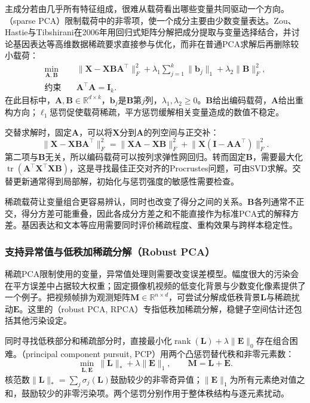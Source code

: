 主成分若由几乎所有特征组成，很难从载荷看出哪些变量共同驱动一个方向。（sparse PCA）限制载荷中的非零项，使一个成分主要由少数变量表达。Zou、Hastie与Tibshirani在2006年用回归式矩阵分解把成分提取与变量选择结合，并讨论基因表达等高维数据稀疏要求直接参与优化，而非在普通PCA求解后再删除较小载荷：
\begin{equation}
  \begin{aligned}
  \min_{\bm{A},\bm{B}}\quad&
    \lVert\bm{X}-\bm{X}\bm{B}\bm{A}^{\top}\rVert_F^2
    +\lambda_1\sum_{j=1}^{k}\lVert\bm{b}_j\rVert_1
    +\lambda_2\lVert\bm{B}\rVert_F^2,\\
  \text{约束}\quad&\bm{A}^{\top}\bm{A}=\bm{I}_k.
  \end{aligned}
  \label{eq:dim-sparse-pca}
\end{equation}
在此目标中，$\bm{A},\bm{B}\in\mathbb{R}^{d\times k}$，$\bm{b}_j$是$\bm{B}$第$j$列，$\lambda_1,\lambda_2\geq0$。$\bm{B}$给出编码载荷，$\bm{A}$给出重构方向；$\ell_1$惩罚促使载荷稀疏，平方惩罚缓解相关变量造成的数值不稳定。

交替求解时，固定$\bm{A}$，可以将$\bm{X}$分到$\bm{A}$的列空间与正交补：
\[
  \lVert\bm{X}-\bm{X}\bm{B}\bm{A}^{\top}\rVert_F^2
  =\lVert\bm{X}\bm{A}-\bm{X}\bm{B}\rVert_F^2
   +\lVert\bm{X}(\bm{I}-\bm{A}\bm{A}^{\top})\rVert_F^2.
\]
第二项与$\bm{B}$无关，所以编码载荷可以按列求弹性网回归。转而固定$\bm{B}$，需要最大化$\operatorname{tr}(\bm{A}^{\top}\bm{X}^{\top}\bm{X}\bm{B})$，这是寻找最佳正交对齐的Procrustes问题，可由SVD求解。交替更新通常得到局部解，初始化与惩罚强度的敏感性需要检查。

稀疏载荷让变量组合更容易辨认，同时也改变了得分之间的关系。$\bm{B}$各列通常不正交，得分方差可能重叠，因此各成分方差之和不能直接作为标准PCA式的解释方差。基因表达和文本等应用需要同时评价稀疏程度、重构效果与跨样本稳定性。

\subsubsection{支持异常值与低秩加稀疏分解（Robust PCA）}
\label{sec:dim-robust-pca}

稀疏PCA限制使用的变量，异常值处理则需要改变误差模型。幅度很大的污染会在平方误差中占据较大权重；固定摄像机视频的低变化背景与少数变化像素提供了一个例子。把视频帧排为观测矩阵$\bm{M}\in\mathbb{R}^{n\times d}$，可尝试分解成低秩背景$\bm{L}$与稀疏扰动$\bm{E}$。这里的（robust PCA, RPCA）专指低秩加稀疏分解，稳健子空间估计还包括其他污染设定。

同时寻找低秩部分和稀疏部分时，直接最小化$\operatorname{rank}(\bm{L})+\lambda\lVert\bm{E}\rVert_0$存在组合困难。（principal component pursuit, PCP）用两个凸惩罚替代秩和非零元素数：
\begin{equation}
  \min_{\bm{L},\bm{E}}\
     \lVert\bm{L}\rVert_*+\lambda\lVert\bm{E}\rVert_1,
  \qquad \bm{M}=\bm{L}+\bm{E}.
  \label{eq:dim-pcp}
\end{equation}
核范数$\lVert\bm{L}\rVert_*=\sum_j\sigma_j(\bm{L})$鼓励较少的非零奇异值；$\lVert\bm{E}\rVert_1$为所有元素绝对值之和，鼓励较少的非零污染项。两个惩罚分别作用于整体秩结构与逐元素扰动。


